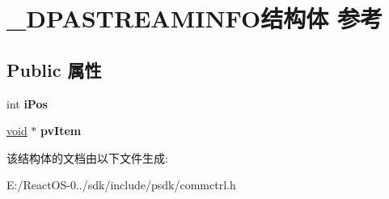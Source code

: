 \hypertarget{struct___d_p_a_s_t_r_e_a_m_i_n_f_o}{}\section{\+\_\+\+D\+P\+A\+S\+T\+R\+E\+A\+M\+I\+N\+F\+O结构体 参考}
\label{struct___d_p_a_s_t_r_e_a_m_i_n_f_o}
\subsection*{Public 属性}
\begin{DoxyCompactItemize}
\item 
\mbox{\label{struct___d_p_a_s_t_r_e_a_m_i_n_f_o_a88fe8581fa43a91f935257efef422e74}} 
int {\bfseries i\+Pos}
\item 
\mbox{\label{struct___d_p_a_s_t_r_e_a_m_i_n_f_o_a882a99cc8895107f126e217645b2845c}} 
\hyperlink{interfacevoid}{void} $\ast$ {\bfseries pv\+Item}
\end{DoxyCompactItemize}


该结构体的文档由以下文件生成\+:\begin{DoxyCompactItemize}
\item 
E\+:/\+React\+O\+S-\/0../sdk/include/psdk/commctrl.\+h\end{DoxyCompactItemize}

